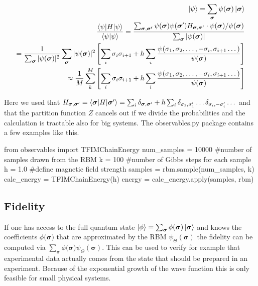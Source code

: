 \documentclass[submission, Phys]{SciPost}
\begin{document}
\begin{align}
\ket{\psi} = \sum_{\bm{\sigma}} \psi(\bm{\sigma}) \ket{\bm{\sigma}} \\
\frac{\braket{\psi | H | \psi}}{\braket{\psi | \psi}} = \frac{\sum_{\bm{\sigma}, \bm{\sigma'}} \psi(\bm{\sigma}) \psi (\bm{\sigma}') H_{\bm{\sigma}, \bm{\sigma}'} \cdot \psi(\bm{\sigma}) / \psi(\bm{\sigma})}{ \sum_{\bm{\sigma}} | \psi(\bm{\sigma})|}  \\
=  \frac{1}{\sum_{\bm{\sigma}} | \psi({\bm{\sigma}} )|^2} \sum_{\bm{\sigma}} | \psi({\bm{\sigma}}) |^2 \left[ \sum_i \sigma_i \sigma_{i+1} + h \sum_i \frac{\psi(\sigma_1, \sigma_2, \dots , -\sigma_i, \sigma_{i+1} \dots)}{\psi (\bm{\sigma})} \right]\\
\approx \frac{1}{M} \sum_k^M \left[ \sum_i \sigma_i \sigma_{i+1} + h \sum_i \frac{\psi(\sigma_1, \sigma_2, \dots , -\sigma_i, \sigma_{i+1} \dots)}{\psi (\bm{\sigma})} \right]
\end{align}

Here we used that $H_{\bm{\sigma}, \bm{\sigma}'}  = \braket{\bm{\sigma} | H | \bm{\sigma}'} = \sum_i \delta_{\bm{\sigma}, \bm{\sigma}'} + h \sum_i \delta_{\sigma_1, \sigma_1'} \dots \delta_{\sigma_i, -\sigma_i'} \dots$ and that the partition function $Z$ cancels out if we divide the probabilities and the calculation is tractable also for big systems.
The observables.py package contains a few examples like this.

\begin{python}
from observables import TFIMChainEnergy
num_samples = 10000 #number of samples drawn from the RBM
k = 100 #number of Gibbs steps for each sample
h = 1.0 #define magnetic field strength
samples = rbm.sample(num_samples, k)
calc_energy = TFIMChainEnergy(h)
energy = calc_energy.apply(samples, rbm)
\end{python}

\subsection{Fidelity}

If one has access to the full quantum state $\ket{\phi} = \sum_{\bm{\sigma}} \phi(\bm{\sigma}) \ket{ \bm{\sigma}}$ and knows the coefficients $\phi(\bm{\sigma)}$ that are approximated by the RBM $\psi_{\Theta}(\bm{\sigma})$ the fidelity can be computed via $\sum_{\bm{\sigma}} \phi(\bm{\sigma)} \psi_{\Theta}(\bm{\sigma})$. This can be used to verify for example that experimental data actually comes from the state that should be prepared in an experiment. Because of the exponential growth of the wave function this is only feasible for small physical systems.
\end{document}
